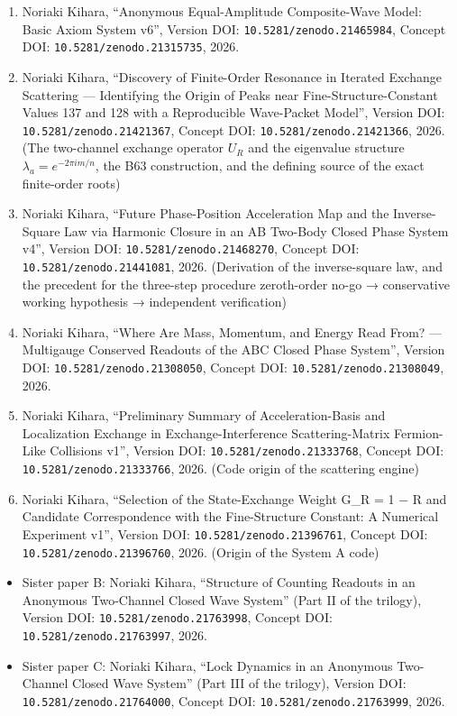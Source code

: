 \documentclass[
  a4paper,
]{article}
\providecommand{\tightlist}{%
  \setlength{\itemsep}{0pt}\setlength{\parskip}{0pt}}
\begin{document}
\begin{enumerate}
\def\labelenumi{\arabic{enumi}.}
\tightlist
\item
  Noriaki Kihara, ``Anonymous Equal-Amplitude Composite-Wave Model:
  Basic Axiom System v6'', Version DOI:
  \texttt{10.5281/zenodo.21465984}, Concept DOI:
  \texttt{10.5281/zenodo.21315735}, 2026.
\item
  Noriaki Kihara, ``Discovery of Finite-Order Resonance in Iterated
  Exchange Scattering --- Identifying the Origin of Peaks near
  Fine-Structure-Constant Values 137 and 128 with a Reproducible
  Wave-Packet Model'', Version DOI: \texttt{10.5281/zenodo.21421367},
  Concept DOI: \texttt{10.5281/zenodo.21421366}, 2026. (The two-channel
  exchange operator \(U_R\) and the eigenvalue structure
  \(\lambda_a=e^{-2\pi i m/n}\), the B63 construction, and the defining
  source of the exact finite-order roots)
\item
  Noriaki Kihara, ``Future Phase-Position Acceleration Map and the
  Inverse-Square Law via Harmonic Closure in an AB Two-Body Closed Phase
  System v4'', Version DOI: \texttt{10.5281/zenodo.21468270}, Concept
  DOI: \texttt{10.5281/zenodo.21441081}, 2026. (Derivation of the
  inverse-square law, and the precedent for the three-step procedure
  zeroth-order no-go → conservative working hypothesis → independent
  verification)
\item
  Noriaki Kihara, ``Where Are Mass, Momentum, and Energy Read From? ---
  Multigauge Conserved Readouts of the ABC Closed Phase System'',
  Version DOI: \texttt{10.5281/zenodo.21308050}, Concept DOI:
  \texttt{10.5281/zenodo.21308049}, 2026.
\item
  Noriaki Kihara, ``Preliminary Summary of Acceleration-Basis and
  Localization Exchange in Exchange-Interference Scattering-Matrix
  Fermion-Like Collisions v1'', Version DOI:
  \texttt{10.5281/zenodo.21333768}, Concept DOI:
  \texttt{10.5281/zenodo.21333766}, 2026. (Code origin of the scattering
  engine)
\item
  Noriaki Kihara, ``Selection of the State-Exchange Weight G\_R = 1 − R
  and Candidate Correspondence with the Fine-Structure Constant: A
  Numerical Experiment v1'', Version DOI:
  \texttt{10.5281/zenodo.21396761}, Concept DOI:
  \texttt{10.5281/zenodo.21396760}, 2026. (Origin of the System A code)
\end{enumerate}

\begin{itemize}
\tightlist
\item
  Sister paper B: Noriaki Kihara, ``Structure of Counting Readouts in an
  Anonymous Two-Channel Closed Wave System'' (Part II of the trilogy),
  Version DOI: \texttt{10.5281/zenodo.21763998}, Concept DOI:
  \texttt{10.5281/zenodo.21763997}, 2026.
\item
  Sister paper C: Noriaki Kihara, ``Lock Dynamics in an Anonymous
  Two-Channel Closed Wave System'' (Part III of the trilogy), Version
  DOI: \texttt{10.5281/zenodo.21764000}, Concept DOI:
  \texttt{10.5281/zenodo.21763999}, 2026.
\end{itemize}
\end{document}
